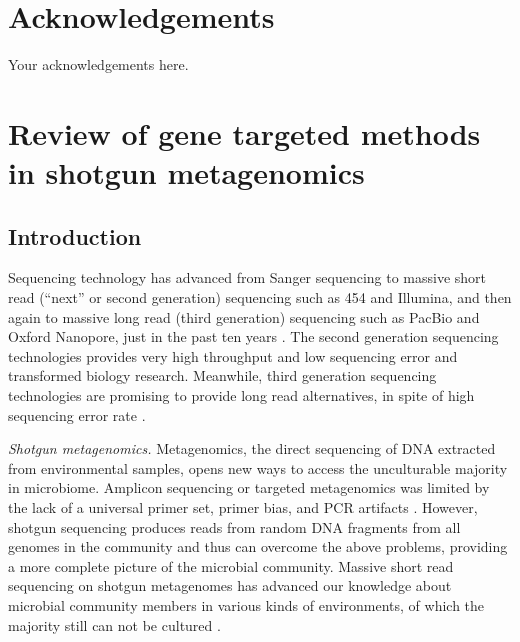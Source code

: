 \documentclass[]{msu-thesis}
\begin{document}
\makecopyrightpage

%
%
\clearpage
\chapter*{Acknowledgements}
\DoubleSpacing %
Your acknowledgements here.
%
\clearpage
\SingleSpacing
\tableofcontents* %
\clearpage
\listoftables %
\clearpage
\listoffigures %
%
%
\mainmatter
%

\chapter{Review of gene targeted methods in shotgun metagenomics}

\section{Introduction}

Sequencing technology has advanced from Sanger sequencing to massive
short read (``next'' or second generation) sequencing such as 454 and
Illumina, and then again to massive long read (third generation) sequencing such
as PacBio and Oxford Nanopore, just in the past ten years
\cite{mardis_impact_2008,pettersson_generations_2009}. The second
generation sequencing technologies provides very high throughput and
low sequencing error and transformed biology
research. Meanwhile, third generation sequencing technologies are
promising to provide long read alternatives, in spite of high
sequencing error rate \cite{rhoads_pacbio_2015}.

\textit{Shotgun metagenomics. } Metagenomics, the direct sequencing of
DNA extracted from environmental samples, opens new ways to access the
unculturable majority in microbiome. Amplicon sequencing or targeted
metagenomics was limited by the lack of a universal primer set, primer bias, and
PCR artifacts
\cite{frank_critical_2008,haas_chimeric_2011,guo_microbial_2015}. However,
shotgun sequencing produces reads from random DNA fragments from all
genomes in the community and thus can overcome the above problems,
providing a more complete picture of the microbial community. Massive short read
sequencing on shotgun metagenomes has advanced our knowledge about
microbial community members in various kinds of environments, of which the majority
still can not be cultured
\cite{howe_tackling_2014,sunagawa_ocean_2015}.
\end{document}
